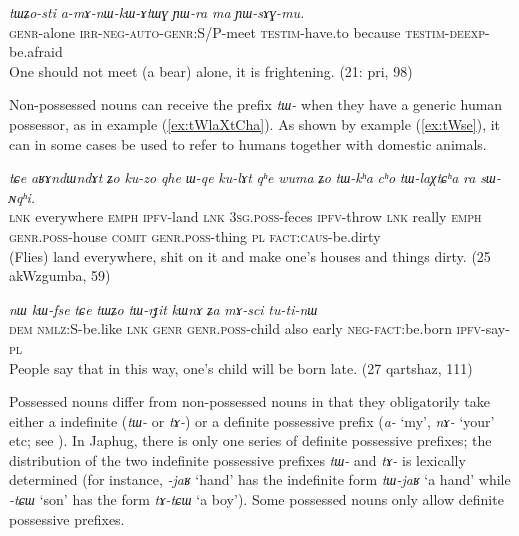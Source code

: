 \documentclass[oneside,a4paper,11pt]{article}
\newcommand{\ipa}[1]{\textit{\phon\mbox{#1}}} %
\newcommand{\refb}[1]{(\ref{#1})}
\begin{document}
\begin{exe}
\ex \label{ex:YWwGnWCar2}
\gll
\ipa{tɯʑo-sti}  	\ipa{a-mɤ-nɯ-kɯ-ɤtɯɣ}  	\ipa{ɲɯ-ra}  	\ipa{ma}  	\ipa{ɲɯ-sɤɣ-mu.}  \\
\textsc{genr}-alone \textsc{irr-neg-auto-genr:S/P}-meet \textsc{testim}-have.to because \textsc{testim-deexp}-be.afraid \\
\glt One should not meet (a bear) alone, it is frightening. (21: pri, 98)
\end{exe}

Non-possessed nouns can receive the prefix \ipa{tɯ-} when they have a generic human possessor, as in example \refb{ex:tWlaXtCha}. As shown by example \refb{ex:tWse}, it can in some cases be used to refer to humans together with domestic animals.

\begin{exe}
\ex \label{ex:tWlaXtCha}
\gll 
\ipa{tɕe}  	\ipa{aʁɤndɯndɤt}  	\ipa{ʑo}  	\ipa{ku-zo}  	\ipa{qhe}  	\ipa{ɯ-qe}  	\ipa{ku-lɤt}  	\ipa{qʰe}	\ipa{wuma}  	\ipa{ʑo}  	\ipa{tɯ-kʰa}  	\ipa{cʰo}  	\ipa{tɯ-laχtɕʰa}  	\ipa{ra}  	\ipa{sɯ-ɴqʰi.}  \\
\textsc{lnk} everywhere \textsc{emph} \textsc{ipfv}-land \textsc{lnk} \textsc{3sg.poss}-feces \textsc{ipfv}-throw \textsc{lnk} really \textsc{emph} \textsc{genr.poss}-house \textsc{comit} \textsc{genr.poss}-thing \textsc{pl} \textsc{fact:caus}-be.dirty \\
\glt (Flies) land everywhere, shit on it and make one's houses and things dirty. (25 akWzgumba, 59)
\end{exe}

\begin{exe}
\ex
\gll
\ipa{nɯ} 	\ipa{kɯ-fse} 	\ipa{tɕe} 	\ipa{tɯʑo} 	\ipa{tɯ-rɟit} 	\ipa{kɯnɤ} 	\ipa{ʑa} 	\ipa{mɤ-sci} 	\ipa{tu-ti-nɯ} \\
\textsc{dem} \textsc{nmlz}:S-be.like \textsc{lnk} \textsc{genr} \textsc{genr.poss}-child  also early \textsc{neg-fact}:be.born \textsc{ipfv}-say-\textsc{pl} \\
\glt People say that in this way, one's child will be born late. (27 qartshaz, 111)
\end{exe}

Possessed nouns differ from non-possessed nouns in that they obligatorily take either a indefinite  (\ipa{tɯ-} or \ipa{tɤ-})  or a definite possessive prefix (\ipa{a-} `my', \ipa{nɤ-} `your' etc; see \citealt{jacques14antipassive}). In Japhug, there is only one series of definite possessive prefixes; the distribution of the two indefinite possessive prefixes \ipa{tɯ-} and \ipa{tɤ-} is lexically determined (for instance, \ipa{-jaʁ} `hand' has the indefinite form \ipa{tɯ-jaʁ} `a hand' while \ipa{-tɕɯ} `son' has the form \ipa{tɤ-tɕɯ} `a boy'). Some possessed nouns only allow definite possessive prefixes.
\end{document}
